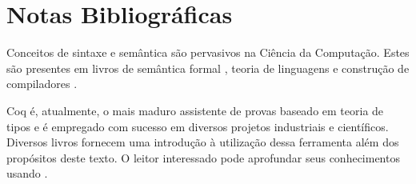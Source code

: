 \section{Notas Bibliogr\'aficas}

Conceitos de sintaxe e sem\^antica s\~ao pervasivos na Ci\^encia da
Computa\c{c}\~ao. Estes s\~ao presentes em livros de sem\^antica
formal \cite{Winskel93}, teoria de linguagens \cite{Hopcroft06} e
constru\c{c}\~ao de compiladores \cite{Aho86}.

Coq \'e, atualmente, o mais maduro assistente de provas baseado em
teoria de tipos e \'e empregado com sucesso em diversos projetos
industriais e cient\'ificos. Diversos livros fornecem
uma introdu\c{c}\~ao \`a utiliza\c{c}\~ao dessa ferramenta al\'em dos
prop\'ositos deste texto. O leitor interessado pode aprofundar seus
conhecimentos usando \cite{coqart,Pierce12,Coqrefman}.

